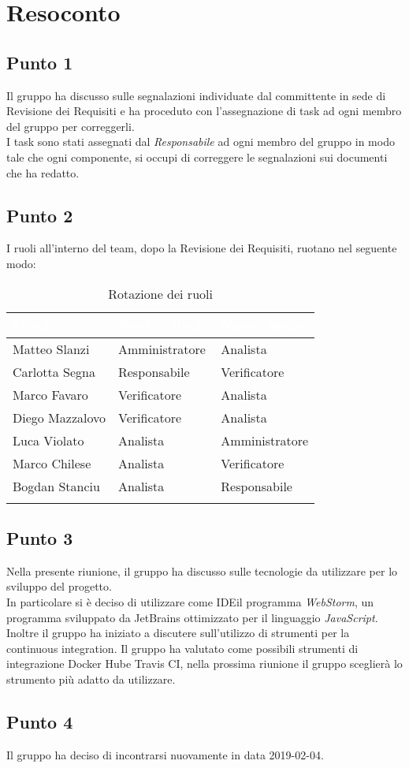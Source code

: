 \section{Resoconto}

\subsection{Punto 1}
Il gruppo ha discusso sulle segnalazioni individuate dal committente in sede di Revisione dei Requisiti e ha proceduto con l'assegnazione di task ad ogni membro del gruppo per correggerli.
\\
I task sono stati assegnati dal \textit{Responsabile} ad ogni membro del gruppo in modo tale che ogni componente, si occupi di correggere le segnalazioni sui documenti che ha redatto.

\subsection{Punto 2}
I ruoli all'interno del team, dopo la Revisione dei Requisiti, ruotano nel seguente modo:\\
\begin{center}
\begin{longtable}[c]{|m{}|m{}|m{}|} 
\hline
\rowcolor{bluelogo}\textbf{\textcolor{white}{Membro}} & \textbf{\textcolor{white}{Vecchio Ruolo}} & \textbf{\textcolor{white}{Nuovo Ruolo}}\\
\hline
Matteo Slanzi & Amministratore & Analista\\
\hline
\rowcolor{grigio}Carlotta Segna & Responsabile & Verificatore\\
\hline
Marco Favaro & Verificatore & Analista\\
\hline
\rowcolor{grigio}Diego Mazzalovo & Verificatore & Analista\\
\hline
Luca Violato & Analista & Amministratore\\
\hline
\rowcolor{grigio}Marco Chilese & Analista & Verificatore\\
\hline
Bogdan Stanciu & Analista & Responsabile\\
\hline

\caption{Rotazione dei ruoli}
\end{longtable}
\end{center}

\subsection{Punto 3}
Nella presente riunione, il gruppo ha discusso sulle tecnologie da utilizzare per lo sviluppo del progetto. 
\\
In particolare si è deciso di utilizzare come IDE\glossario il programma \textit{WebStorm}, un programma sviluppato da JetBrains ottimizzato per il linguaggio \textit{JavaScript}. 
\\
Inoltre il gruppo ha iniziato a discutere sull'utilizzo di strumenti per la continuous integration\glossario. 
Il gruppo ha valutato come possibili strumenti di integrazione Docker Hub\glossario e Travis CI\glossario, nella prossima riunione il gruppo sceglierà lo strumento più adatto da utilizzare.

\subsection{Punto 4}
Il gruppo ha deciso di incontrarsi nuovamente in data 2019-02-04.